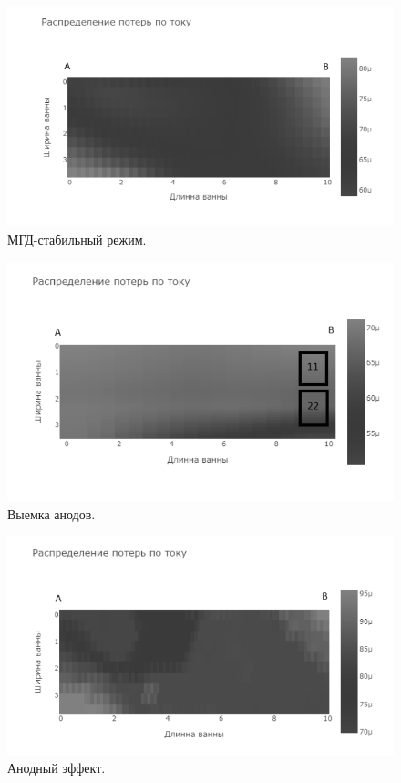 \documentclass{article}
\begin{document}
\begin{figure}[H]
    \centering
    \includegraphics[width=150mm]{h.png}
    \caption{МГД-стабильный режим.}
    \label{fig:stabrasp}
\end{figure}

\begin{figure}[H]
    \centering
    \includegraphics[width=150mm]{выемка анодов.png}
    \caption{Выемка анодов.}
    \label{fig:viemkaanodrasp} 
\end{figure}

\begin{figure}[H]
    \centering
    \includegraphics[width=150mm]{анодный эффект.png}
    \caption{Анодный эффект.}
    \label{fig:anodeffectrasp} 
\end{figure}
\end{document}
